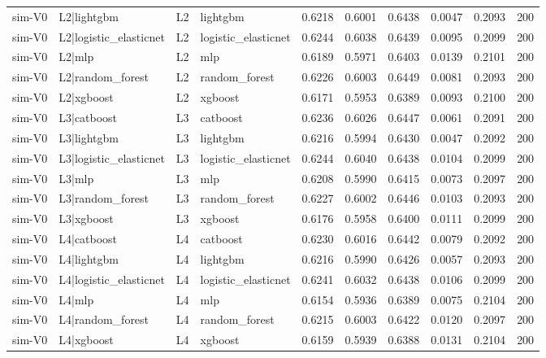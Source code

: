 \begin{table}
\begin{tabular}{llllrrrrrr}
sim-V0 & L2|lightgbm & L2 & lightgbm & 0.6218 & 0.6001 & 0.6438 & 0.0047 & 0.2093 & 200 \\
sim-V0 & L2|logistic\_elasticnet & L2 & logistic\_elasticnet & 0.6244 & 0.6038 & 0.6439 & 0.0095 & 0.2099 & 200 \\
sim-V0 & L2|mlp & L2 & mlp & 0.6189 & 0.5971 & 0.6403 & 0.0139 & 0.2101 & 200 \\
sim-V0 & L2|random\_forest & L2 & random\_forest & 0.6226 & 0.6003 & 0.6449 & 0.0081 & 0.2093 & 200 \\
sim-V0 & L2|xgboost & L2 & xgboost & 0.6171 & 0.5953 & 0.6389 & 0.0093 & 0.2100 & 200 \\
sim-V0 & L3|catboost & L3 & catboost & 0.6236 & 0.6026 & 0.6447 & 0.0061 & 0.2091 & 200 \\
sim-V0 & L3|lightgbm & L3 & lightgbm & 0.6216 & 0.5994 & 0.6430 & 0.0047 & 0.2092 & 200 \\
sim-V0 & L3|logistic\_elasticnet & L3 & logistic\_elasticnet & 0.6244 & 0.6040 & 0.6438 & 0.0104 & 0.2099 & 200 \\
sim-V0 & L3|mlp & L3 & mlp & 0.6208 & 0.5990 & 0.6415 & 0.0073 & 0.2097 & 200 \\
sim-V0 & L3|random\_forest & L3 & random\_forest & 0.6227 & 0.6002 & 0.6446 & 0.0103 & 0.2093 & 200 \\
sim-V0 & L3|xgboost & L3 & xgboost & 0.6176 & 0.5958 & 0.6400 & 0.0111 & 0.2099 & 200 \\
sim-V0 & L4|catboost & L4 & catboost & 0.6230 & 0.6016 & 0.6442 & 0.0079 & 0.2092 & 200 \\
sim-V0 & L4|lightgbm & L4 & lightgbm & 0.6216 & 0.5990 & 0.6426 & 0.0057 & 0.2093 & 200 \\
sim-V0 & L4|logistic\_elasticnet & L4 & logistic\_elasticnet & 0.6241 & 0.6032 & 0.6438 & 0.0106 & 0.2099 & 200 \\
sim-V0 & L4|mlp & L4 & mlp & 0.6154 & 0.5936 & 0.6389 & 0.0075 & 0.2104 & 200 \\
sim-V0 & L4|random\_forest & L4 & random\_forest & 0.6215 & 0.6003 & 0.6422 & 0.0120 & 0.2097 & 200 \\
sim-V0 & L4|xgboost & L4 & xgboost & 0.6159 & 0.5939 & 0.6388 & 0.0131 & 0.2104 & 200 \\
\bottomrule
\end{tabular}
\end{table}
